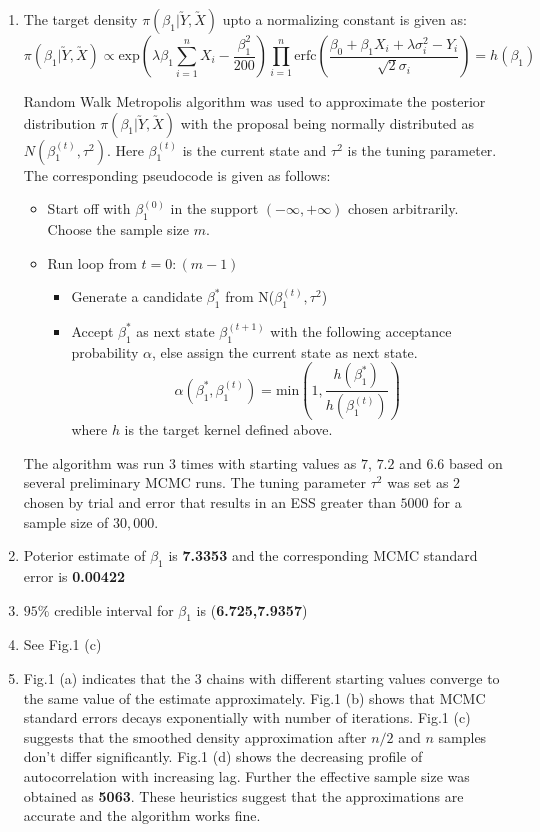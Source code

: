 \documentclass[12pt]{article}
\begin{document}
\begin{enumerate}[label=(\alph*)]
\item The target density $\pi(\beta_1|\utilde{Y},\utilde{X})$ upto a normalizing constant is given as:
\[\pi(\beta_1|\utilde{Y},\utilde{X})\propto \text{exp}\left(\lambda\beta_1\sum_{i=1}^{n}X_i-\dfrac{\beta_1^2}{200}\right)\prod_{i=1}^{n}\text{erfc}\left(\dfrac{\beta_0+\beta_1 X_i+\lambda\sigma_i^2-Y_i}{\sqrt{2}\sigma_i}\right)=h(\beta_1)\]

Random Walk Metropolis algorithm  was used to approximate the posterior distribution $\pi(\beta_1|\utilde{Y},\utilde{X})$ with the proposal being normally distributed as $N(\beta_1^{(t)},\tau^2)$. Here $\beta_1^{(t)}$ is the current state and $\tau^2$ is the tuning parameter. The corresponding pseudocode is given as follows:

\begin{itemize}
\item Start off with $\beta_1^{(0)}$ in the support $(-\infty,+\infty)$ chosen arbitrarily. Choose the sample size $m$.
\item Run loop from $t=0:(m-1)$
\begin{itemize}
\item Generate a candidate $\beta_1^{*}$ from N($\beta_1^{(t)},\tau^2$)
\item Accept $\beta_1^{*}$ as next state $\beta_1^{(t+1)}$ with the following acceptance probability $\alpha$, else assign the current state as next state.
\[\alpha(\beta_1^{*},\beta_1^{(t)})=\text{min}\left(1,\dfrac{h(\beta_1^{*})}{h(\beta_1^{(t)})}\right)\]
where $h$ is the target kernel defined above.
\end{itemize}
\end{itemize}
The algorithm was run $3$ times with starting values as $7$, $7.2$ and $6.6$ based on several preliminary MCMC runs. The tuning parameter $\tau^2$  was set as $2$ chosen by trial and error that results in an ESS greater than $5000$ for a sample size of $30,000$.

\item Poterior estimate of $\beta_1$ is \textbf{7.3353} and the corresponding MCMC standard error is \textbf{0.00422}

\item $95\%$ credible interval for $\beta_1$ is (\textbf{6.725,7.9357})

\item See Fig.1 (c)
\item Fig.1 (a) indicates that the $3$ chains with different starting values converge to the same value of the estimate approximately. Fig.1 (b) shows that MCMC standard errors decays exponentially with number of iterations. Fig.1 (c) suggests that the smoothed density approximation after $n/2$ and $n$ samples don't differ significantly. Fig.1 (d) shows the decreasing profile of autocorrelation with increasing lag. Further the effective sample size was obtained as \textbf{5063}. These heuristics suggest that the approximations are accurate and the algorithm works fine.


\end{enumerate}
\end{document}
